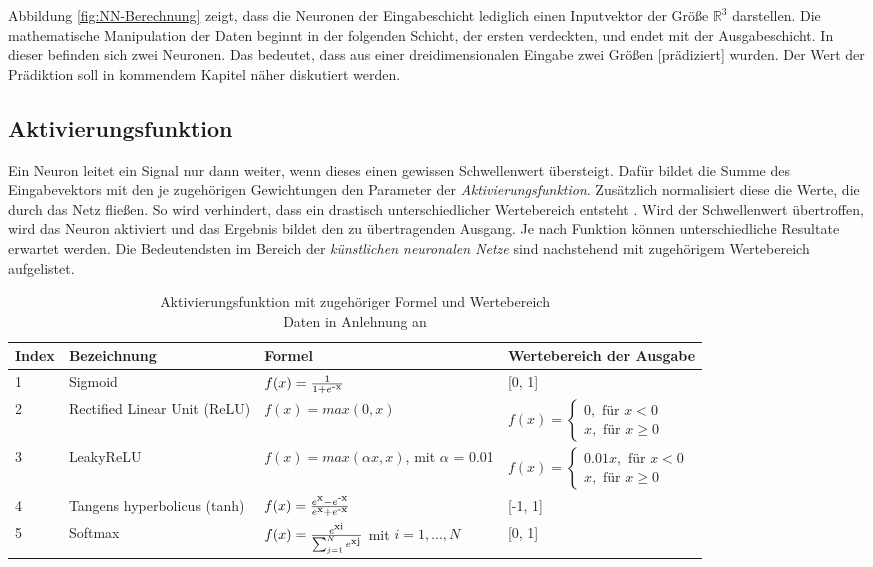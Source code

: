 Abbildung \ref{fig:NN-Berechnung} zeigt, dass die Neuronen der Eingabeschicht lediglich einen Inputvektor der Größe $\mathbb{R}^3$ darstellen. Die mathematische Manipulation der Daten beginnt in der folgenden Schicht, der ersten verdeckten, und endet mit der Ausgabeschicht. In dieser befinden sich zwei Neuronen. Das bedeutet, dass \glqq aus einer dreidimensionalen Eingabe zwei Größen [prädiziert]\grqq{} \cite[S.174]{14} wurden. Der Wert der Prädiktion soll in kommendem Kapitel näher diskutiert werden.

\subsection{Aktivierungsfunktion} 
\label{Aktivierungsfunktion}
Ein Neuron leitet ein Signal nur dann weiter, wenn dieses einen gewissen Schwellenwert übersteigt. Dafür bildet die Summe des Eingabevektors mit den je zugehörigen Gewichtungen den Parameter der \textit{Aktivierungsfunktion}. Zusätzlich normalisiert diese die Werte, die durch das Netz fließen. So wird verhindert, dass ein drastisch unterschiedlicher Wertebereich entsteht \cite[vlg.][]{18}. 
Wird der Schwellenwert übertroffen, wird das Neuron aktiviert und das Ergebnis bildet den zu übertragenden Ausgang. Je nach Funktion können unterschiedliche Resultate erwartet werden. Die Bedeutendsten im Bereich der \textit{künstlichen neuronalen Netze} sind nachstehend mit zugehörigem Wertebereich aufgelistet. \cite[vgl.][S. 70]{12} \cite[vgl.][S. 35]{13} 

\begin{table}[h]
	\begin{tabular}[h]{p{1cm}|p{4cm}|p{3.9cm}|p{5.1cm}}
		Index & Bezeichnung & Formel & Wertebereich der Ausgabe \\
		\hline
		\rule{0pt}{2em}
		1 & Sigmoid & ${f(x)= \frac {1}{1+e\textsuperscript{-x}}}$ & [0, 1] \\
		\rule{0pt}{2em}
		2 & Rectified Linear Unit (ReLU) & ${f(x) = max(0,x)}$ & 
		$f(x)= \begin{cases}
		0, \mbox{ für } x < 0 \\ x, \mbox{ für } x \ge 0 
		\end{cases}$ \\
		\rule{0pt}{2em}
		3 & LeakyReLU & ${f(x) = max(\alpha x,x)}$, mit $\alpha$ = 0.01 &
		$f(x)= \begin{cases}
		0.01x, \mbox{ für } x < 0 \\ x, \mbox{ für } x \ge 0 
		\end{cases}$ \\
		\rule{0pt}{2em}
		4 & Tangens hyperbolicus (tanh) & ${f(x)= \frac {e\textsuperscript{x} - e \textsuperscript{-x}} {e\textsuperscript{x} + e\textsuperscript{-x}}}$ & [-1, 1] \\
		\rule{0pt}{2em}
		5 & Softmax & $f(x)= \frac{e\textsuperscript{xi}}{\sum_{j=1}^{N} e\textsuperscript{xj}}$ mit $i = 1,...,N$ & [0, 1]
	\end{tabular}
	\captionsetup{justification=centering}
	\caption{Aktivierungsfunktion mit zugehöriger Formel und Wertebereich \\ Daten in Anlehnung an \cite[vgl.][]{18}}
	\label{tab:Aktivierungsfunktion}
\end{table}

